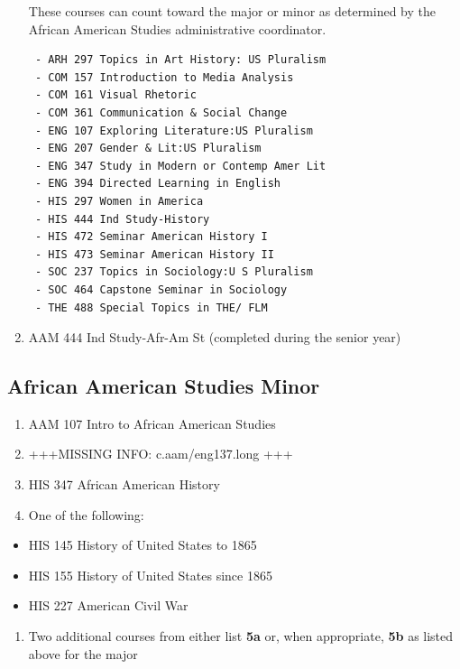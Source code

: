 \documentclass[
  letterpaper,
]{scrbook}
\providecommand{\tightlist}{%
  \setlength{\itemsep}{0pt}\setlength{\parskip}{0pt}}
\begin{document}
\begin{enumerate}
  These courses can count toward the major or minor as determined by the
  African American Studies administrative coordinator.

\begin{verbatim}
 - ARH 297 Topics in Art History: US Pluralism 
 - COM 157 Introduction to Media Analysis 
 - COM 161 Visual Rhetoric 
 - COM 361 Communication & Social Change 
 - ENG 107 Exploring Literature:US Pluralism 
 - ENG 207 Gender & Lit:US Pluralism 
 - ENG 347 Study in Modern or Contemp Amer Lit 
 - ENG 394 Directed Learning in English 
 - HIS 297 Women in America 
 - HIS 444 Ind Study-History 
 - HIS 472 Seminar American History I 
 - HIS 473 Seminar American History II 
 - SOC 237 Topics in Sociology:U S Pluralism 
 - SOC 464 Capstone Seminar in Sociology 
 - THE 488 Special Topics in THE/ FLM 
\end{verbatim}
\item
  AAM 444 Ind Study-Afr-Am St (completed during the senior year)
\end{enumerate}

\subsection{African American Studies
Minor}\label{african-american-studies-minor}

\begin{enumerate}
\def\labelenumi{\arabic{enumi}.}
\tightlist
\item
  AAM 107 Intro to African American Studies\\
\item
  +++MISSING INFO: c.aam/eng137.long +++
\item
  HIS 347 African American History\\
\item
  One of the following:
\end{enumerate}

\begin{itemize}
\tightlist
\item
  HIS 145 History of United States to 1865
\item
  HIS 155 History of United States since 1865
\item
  HIS 227 American Civil War
\end{itemize}

\begin{enumerate}
\def\labelenumi{\arabic{enumi}.}
\setcounter{enumi}{4}
\tightlist
\item
  Two additional courses from either list \textbf{5a} or, when
  appropriate, \textbf{5b} as listed above for the major
\end{enumerate}
\end{document}
